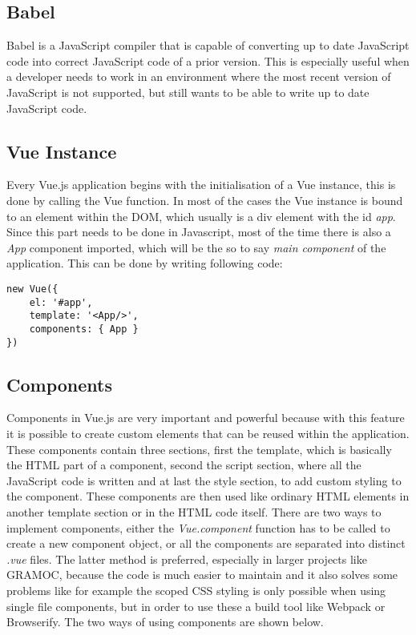 \subsection{Babel}
Babel is a JavaScript compiler that is capable of converting up to date JavaScript code into correct JavaScript code of a prior version. This is especially useful when a developer needs to work in an environment where the most recent version of JavaScript is not supported, but still wants to be able to write up to date JavaScript code.

\subsection{Vue Instance}
Every Vue.js application begins with the initialisation of a Vue instance, this is done by calling the {Vue} function. In most of the cases the Vue instance is bound to an element within the DOM, which usually is a div element with the id \textit{app}. Since this part needs to be done in Javascript, most of the time there is also a \textit{App} component imported, which will be the so to say \textit{main component} of the application. This can be done by writing following code:

\begin{minipage}{\linewidth}
\begin{lstlisting}[caption={Creating a Vue instance}, label=lst:vue-instance, captionpos=b, style=htmlcssjs]
new Vue({
    el: '#app',
    template: '<App/>',
    components: { App }
})
\end{lstlisting}
\end{minipage}

\subsection{Components}
Components in Vue.js are very important and powerful because with this feature it is possible to create custom elements that can be reused within the application. These components contain three sections, first the template, which is basically the HTML part of a component, second the script section, where all the JavaScript code is written and at last the style section, to add custom styling to the component. These components are then used like ordinary HTML elements in another template section or in the HTML code itself. There are two ways to implement components, either the \textit{Vue.component} function has to be called to create a new component object, or all the components are separated into distinct \textit{.vue} files. The latter method is preferred, especially in larger projects like GRAMOC, because the code is much easier to maintain and it also solves some problems like for example the scoped CSS styling is only possible when using single file components, but in order to use these a build tool like Webpack or Browserify. The two ways of using components are shown below.

